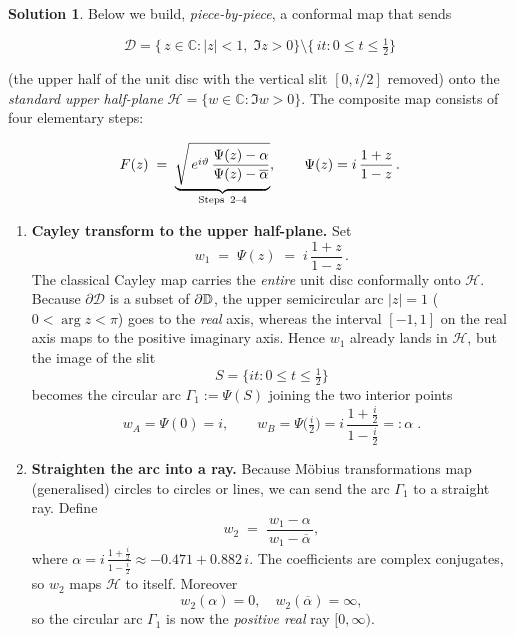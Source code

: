 \documentclass[12pt]{article}
\theoremstyle{definition} %
\newtheorem{solution}{Solution}
\theoremstyle{plain} %
\begin{document}
  \begin{solution}
    Below we build, \emph{piece-by-piece}, a conformal map that sends  
    
    \[
    \boxed{\; 
       \mathcal D
         = \bigl\{\,z\in\mathbb{C} : |z|<1,\; \Im z>0 \bigr\}
           \setminus
           \bigl\{\,it : 0\le t\le \tfrac12 \bigr\}
       \;}
    \]
    
    (the upper half of the unit disc with the vertical slit
    $[0,i/2]$ removed) onto the \emph{standard upper half-plane}
    $\mathcal H=\{w\in\mathbb{C}:\Im w>0\}$.
    The composite map consists of four elementary steps:
    
    \[
    F(z)
      \;=\;
      \underbrace{\sqrt{\,
            e^{i\vartheta}\,
            \frac{\displaystyle\Psi(z)-\alpha}
                 {\displaystyle\Psi(z)-\overline{\alpha}}
          }}_{\text{Steps \,2--4}}
      ,\qquad
      \Psi(z)
         = i\,\frac{1+z}{1-z}\, .
    \]
    
    \begin{enumerate}[label=\textbf{Step \arabic*:}, itemsep=1.4ex]
    
    \item \textbf{Cayley transform to the upper half-plane.}\;
    Set
    \[
    w_1 \;=\; \Psi(z) \;=\; i\,\frac{1+z}{1-z}\, .
    \]
    The classical Cayley map carries the \emph{entire} unit disc
    conformally onto $\mathcal H$.
    Because $\partial\mathcal D$ is a subset of $\partial\Bbb D$,
    the upper semicircular arc $|z|=1$ ($0<\arg z<\pi$) goes to the
    \emph{real} axis,
    whereas the interval $[-1,1]$ on the real axis maps to the
    positive imaginary axis.
    Hence $w_1$ already lands in $\mathcal H$, but the image of the slit
    \[
    S=\{it:0\le t\le\tfrac12\}
    \]
    becomes the circular arc
    \(
    \Gamma_1 := \Psi(S)
    \)
    joining the two interior points
    \[
    w_A = \Psi(0)=i, 
    \qquad
    w_B = \Psi\!\bigl(\tfrac{i}{2}\bigr)
          = i\,\frac{1+\tfrac{i}{2}}{1-\tfrac{i}{2}}
          =: \alpha
          \;.
    \]
    
    \item \textbf{Straighten the arc into a ray.}\;
    Because Möbius transformations map (generalised) circles to
    circles or lines, we can send the arc $\Gamma_1$ to a straight ray.
    Define
    \[
    w_2
       \;=\;
       \frac{\,w_1-\alpha\,}{\,w_1-\overline{\alpha}\,},
    \]
    where
    $\displaystyle
       \alpha = i\,\frac{1+\tfrac{i}{2}}{1-\tfrac{i}{2}}
              \approx -0.471 + 0.882\,i
    $.
    The coefficients are complex conjugates, so
    $w_2$ maps $\mathcal H$ to itself.
    Moreover
    \[
    w_2(\alpha)=0,
    \quad
    w_2(\overline{\alpha})=\infty,
    \]
    so the circular arc $\Gamma_1$ is now the \emph{positive real} ray
    $[0,\infty)$.
    

\end{enumerate}
\end{solution}
\end{document}
